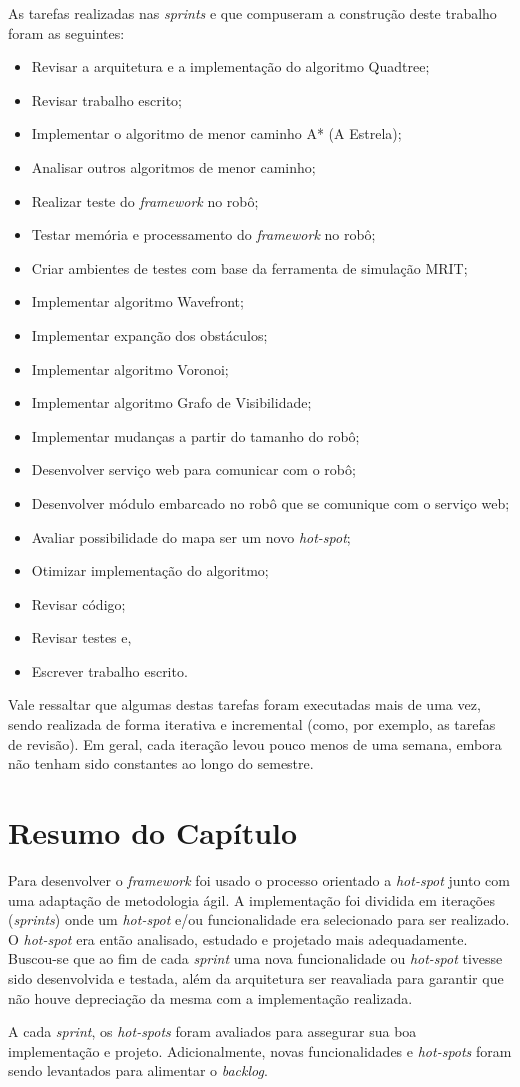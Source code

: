 As tarefas realizadas nas \textit{sprints} e que compuseram a construção deste trabalho foram as seguintes:
\begin{itemize}
  \item Revisar a arquitetura e a implementação do algoritmo Quadtree;
  \item Revisar trabalho escrito;
  \item Implementar o algoritmo de menor caminho A* (A Estrela);
  \item Analisar outros algoritmos de menor caminho;
  \item Realizar teste do \textit{framework} no robô;
  \item Testar memória e processamento do \textit{framework} no robô;
  \item Criar ambientes de testes com base da ferramenta de simulação MRIT;
  \item Implementar algoritmo Wavefront;
  \item Implementar expanção dos obstáculos;
  \item Implementar algoritmo Voronoi;
  \item Implementar algoritmo Grafo de Visibilidade;
  \item Implementar mudanças a partir do tamanho do robô;
  \item Desenvolver serviço web para comunicar com o robô;
  \item Desenvolver módulo embarcado no robô que se comunique com o serviço web;
  \item Avaliar possibilidade do mapa ser um novo \textit{hot-spot};
  \item Otimizar implementação do algoritmo;
  \item Revisar código;
  \item Revisar testes e,
  \item Escrever trabalho escrito.
\end{itemize}

Vale ressaltar que algumas destas tarefas foram executadas mais de uma vez, sendo realizada de forma iterativa e incremental (como, por exemplo, as tarefas de revisão). Em geral, cada iteração levou pouco menos de uma semana, embora não tenham sido constantes ao longo do semestre.

\section{Resumo do Capítulo}

Para desenvolver o \textit{framework} foi usado o processo orientado a \textit{hot-spot} junto com uma adaptação de metodologia ágil. A implementação foi dividida em iterações (\textit{sprints}) onde um \textit{hot-spot} e/ou funcionalidade era selecionado para ser realizado. O \textit{hot-spot} era então analisado, estudado e projetado mais adequadamente. Buscou-se que ao fim de cada \textit{sprint} uma nova funcionalidade ou \textit{hot-spot} tivesse sido desenvolvida e testada, além da arquitetura ser reavaliada para garantir que não houve depreciação da mesma com a implementação realizada.

A cada \textit{sprint}, os \textit{hot-spots} foram avaliados para assegurar sua boa implementação e projeto. Adicionalmente, novas funcionalidades e \textit{hot-spots} foram sendo levantados para alimentar o \textit{backlog}.
